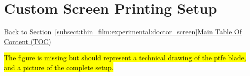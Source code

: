 \chapter{Custom Screen Printing Setup}\label{app:screen_printing}

\begin{appbox}
	Back to Section~\ref{subsect:thin_film:experimental:doctor_screen}\hfill \hyperref[chapter:toc]{Main Table Of Content (TOC)}
\end{appbox}


\hl{The figure is missing but should represent a technical drawing of the \gls{ptfe} blade, and a picture of the complete setup.}